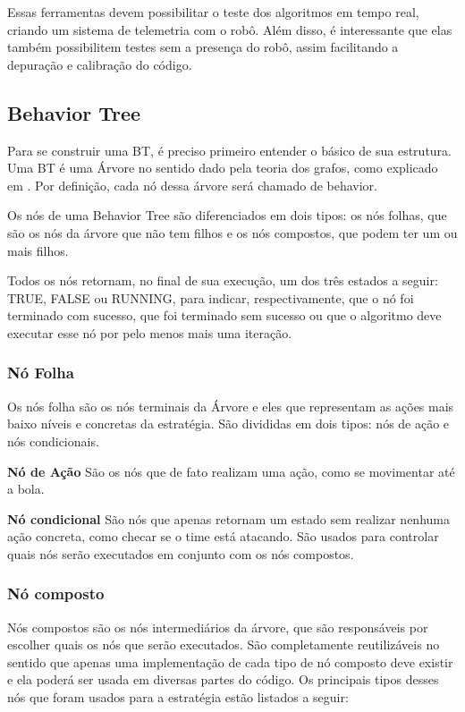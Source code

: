 \documentclass[10pt,fleqn,a4paper]{article}
\begin{document}
	Essas ferramentas devem possibilitar o teste dos algoritmos em tempo real, criando um sistema de telemetria com o robô. Além disso, é interessante que elas também possibilitem testes sem a presença do robô, assim facilitando a depuração e calibração do código.

\subsection{Behavior Tree}

Para se construir uma BT, é preciso primeiro entender o básico de sua estrutura. Uma BT é uma Árvore no sentido dado pela teoria dos grafos, como explicado em \cite{west2001introduction}. Por definição, cada nó dessa árvore será chamado de behavior.

Os nós de uma Behavior Tree são diferenciados em dois tipos: os nós folhas, que são os nós da árvore que não tem filhos e os nós compostos, que podem ter um ou mais filhos.

Todos os nós retornam, no final de sua execução, um dos três estados a seguir: TRUE, FALSE ou RUNNING, para indicar, respectivamente, que o nó foi terminado com sucesso, que foi terminado sem sucesso ou que o algoritmo deve executar esse nó por pelo menos mais uma iteração.

\subsubsection{Nó Folha}

Os nós folha são os nós terminais da Árvore e eles que representam as ações mais baixo níveis e concretas da estratégia. São divididas em dois tipos: nós de ação e nós condicionais.

\textbf{Nó de Ação} São os nós que de fato realizam uma ação, como se movimentar até a bola.

\textbf{Nó condicional} São nós que apenas retornam um estado sem realizar nenhuma ação concreta, como checar se o time está atacando. São usados para controlar quais nós serão executados em conjunto com os nós compostos.

\subsubsection{Nó composto}

Nós compostos são os nós intermediários da árvore, que  são responsáveis por escolher quais os nós que serão executados. São completamente reutilizáveis no sentido que apenas uma implementação de cada tipo de nó composto deve existir e ela poderá ser usada em diversas partes do código. Os principais tipos desses nós que foram usados para a estratégia estão listados a seguir:
\end{document}
